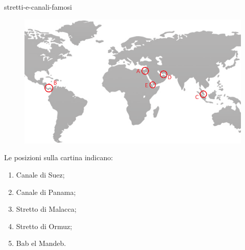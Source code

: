 \documentclass[preview]{standalone}
\begin{document}
\begin{snippet}{stretti-e-canali-famosi}
    \setlength{\intextsep}{0pt}%
    \begin{figure}
        \includegraphics[width=.65\textwidth]{resources/mappa-stretti-canali.png}
        \vspace{-2.5cm}
    \end{figure}
    Le posizioni sulla cartina indicano:

    \begin{enumerate}[label=\Alph*:]
        \item Canale di Suez;
        \item Canale di Panama;
        \item Stretto di Malacca;
        \item Stretto di Ormuz;
        \item Bab el Mandeb.
    \end{enumerate}
    \wrapfill
\end{snippet}
\end{document}
